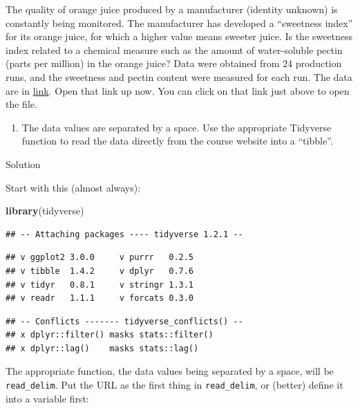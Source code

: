 \documentclass[]{tufte-book}
\newenvironment{Shaded}{}{}
\newcommand{\KeywordTok}[1]{\textcolor[rgb]{0.00,0.44,0.13}{\textbf{#1}}}
\newcommand{\NormalTok}[1]{#1}
\providecommand{\tightlist}{%
  \setlength{\itemsep}{0pt}\setlength{\parskip}{0pt}}
\theoremstyle{definition}
\theoremstyle{definition}
\theoremstyle{definition}
\theoremstyle{remark}
\begin{document}
The quality of orange juice produced by a manufacturer (identity
unknown) is constantly being monitored. The manufacturer has developed a
``sweetness index'' for its orange juice, for which a higher value means
sweeter juice. Is the sweetness index related to a chemical measure such
as the amount of water-soluble pectin (parts per million) in the orange
juice? Data were obtained from 24 production runs, and the sweetness and
pectin content were measured for each run. The data are in
\href{http://www.utsc.utoronto.ca/~butler/c32/ojuice.txt}{link}. Open
that link up now. You can click on that link just above to open the
file.

\begin{enumerate}
\def\labelenumi{(\alph{enumi})}
\tightlist
\item
  The data values are separated by a space. Use the appropriate
  Tidyverse function to read the data directly from the course website
  into a ``tibble''.
\end{enumerate}

Solution

Start with this (almost always):

\begin{Shaded}
\begin{Highlighting}[]
\KeywordTok{library}\NormalTok{(tidyverse)}
\end{Highlighting}
\end{Shaded}

\begin{verbatim}
## -- Attaching packages ---- tidyverse 1.2.1 --
\end{verbatim}

\begin{verbatim}
## v ggplot2 3.0.0     v purrr   0.2.5
## v tibble  1.4.2     v dplyr   0.7.6
## v tidyr   0.8.1     v stringr 1.3.1
## v readr   1.1.1     v forcats 0.3.0
\end{verbatim}

\begin{verbatim}
## -- Conflicts ------- tidyverse_conflicts() --
## x dplyr::filter() masks stats::filter()
## x dplyr::lag()    masks stats::lag()
\end{verbatim}

The appropriate function, the data values being separated by a space,
will be \texttt{read\_delim}. Put the URL as the first thing in
\texttt{read\_delim}, or (better) define it into a variable first:
\end{document}
